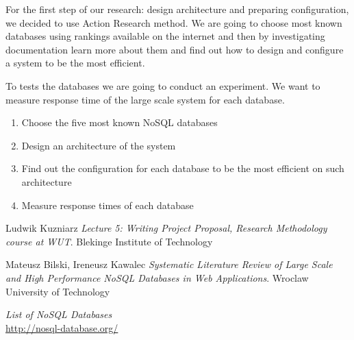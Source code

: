 \documentclass[times, 10pt,twocolumn]{article}
\newcounter{firstbib}
\begin{document}

For the first step of our research: design architecture and preparing configuration, we decided to use Action Research method.
We are going to choose most known databases using rankings available on the internet and then by investigating
documentation learn more about them and find out how to design and configure a system to be the most efficient.

To tests the databases we are going to conduct an experiment. We want to measure response time of the large scale
system for each database.


\begin{enumerate}
  \item Choose the five most known NoSQL databases
  \item Design an architecture of the system
  \item Find out the configuration for each database to be the most efficient on such architecture
  \item Measure response times of each database
\end{enumerate}

\begin{thebibliography}{9}  

\setcounter{enumiv}{\value{firstbib}}
      
      Ludwik Kuzniarz
      \emph{Lecture 5: Writing Project Proposal, Research Methodology course at WUT}. Blekinge Institute of Technology
      
      Mateusz Bilski, Ireneusz Kawalec
      \emph{Systematic Literature Review of Large Scale and High Performance NoSQL Databases in Web Applications}. Wroclaw University of Technology
      
      \emph{List of NoSQL Databases} \\
      \url{http://nosql-database.org/}

\end{thebibliography}
\end{document}
